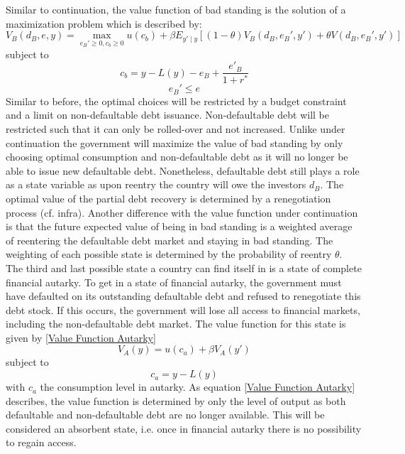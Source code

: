 Similar to continuation, the value function of bad standing is the solution of a maximization problem which is described by:
\begin{equation}\label{Value Function bad}
    V_B(d_B,e,y) = \max_{e_B'\geq 0, c_b \geq 0} u(c_b) + \beta E_{y'\mid y} [(1-\theta)V_B(d_B,e_B',y') + \theta V(d_B,e_B',y')]
\end{equation}
subject to
\begin{equation*}
  c_b = y -L(y) - e_B + \frac{e'_B}{1+r^*}
\end{equation*}
\begin{equation*}
    e_B'\leq e
\end{equation*}
Similar to before, the optimal choices will be restricted by a budget constraint and a limit on non-defaultable debt issuance. Non-defaultable debt will be restricted such that it can only be rolled-over and not increased. Unlike under continuation the government will maximize the value of bad standing by only choosing optimal consumption and non-defaultable debt as it will no longer be able to issue new defaultable debt. Nonetheless, defaultable debt still plays a role as a state variable as upon reentry the country will owe the investors $d_B$. The optimal value of the partial debt recovery is determined by a renegotiation process (cf. infra). Another difference with the value function under continuation is that the future expected value of being in bad standing is a weighted average of reentering the defaultable debt market and staying in bad standing. The weighting of each possible state is determined by the probability of reentry $\theta$.\\

The third and last possible state a country can find itself in is a state of complete financial autarky. To get in a state of financial autarky, the government must have defaulted on its outstanding defaultable debt and refused to renegotiate this debt stock. If this occurs, the government will lose all access to financial markets, including the non-defaultable debt market. The value function for this state is given by \eqref{Value Function Autarky}
\begin{equation}\label{Value Function Autarky}
    V_A(y) = u(c_a) + \beta V_A(y')
\end{equation}
subject to
\begin{equation*}
    c_a = y - L(y)
\end{equation*}
with $c_a$ the consumption level in autarky. As equation \eqref{Value Function Autarky} describes, the value function is determined by only the level of output as both defaultable and non-defaultable debt are no longer available. This will be considered an absorbent state, i.e. once in financial autarky there is no possibility to regain access.\\


